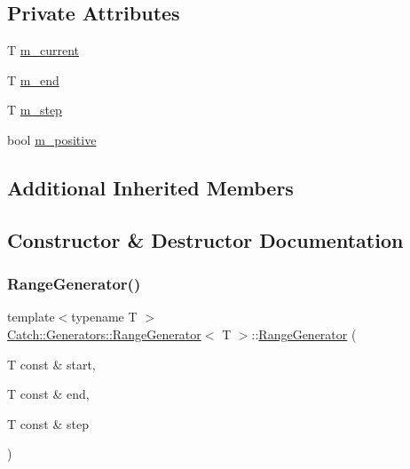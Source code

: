 \subsection*{Private Attributes}
\begin{DoxyCompactItemize}
\item 
T \mbox{\hyperlink{class_catch_1_1_generators_1_1_range_generator_af2be334be7dc9be55bcb75b2609dea64}{m\+\_\+current}}
\item 
T \mbox{\hyperlink{class_catch_1_1_generators_1_1_range_generator_adea61e79cfc8c51efdea2526daa33dec}{m\+\_\+end}}
\item 
T \mbox{\hyperlink{class_catch_1_1_generators_1_1_range_generator_a44e4683a9f98df49792502a2c51ff249}{m\+\_\+step}}
\item 
bool \mbox{\hyperlink{class_catch_1_1_generators_1_1_range_generator_ad4f0ce4efcf625e04150547363437ff8}{m\+\_\+positive}}
\end{DoxyCompactItemize}
\subsection*{Additional Inherited Members}


\subsection{Constructor \& Destructor Documentation}
\mbox{\label{class_catch_1_1_generators_1_1_range_generator_a6a9b3cc009471c085c985642e0ab102e}} 
\subsubsection{\texorpdfstring{RangeGenerator()}{RangeGenerator()}\hspace{0.1cm}{\footnotesize\ttfamily [1/2]}}
{\footnotesize\ttfamily template$<$typename T $>$ \\
\mbox{\hyperlink{class_catch_1_1_generators_1_1_range_generator}{Catch\+::\+Generators\+::\+Range\+Generator}}$<$ T $>$\+::\mbox{\hyperlink{class_catch_1_1_generators_1_1_range_generator}{Range\+Generator}} (\begin{DoxyParamCaption}\item[{T const \&}]{start,  }\item[{T const \&}]{end,  }\item[{T const \&}]{step }\end{DoxyParamCaption})\hspace{0.3cm}{\ttfamily [inline]}}


